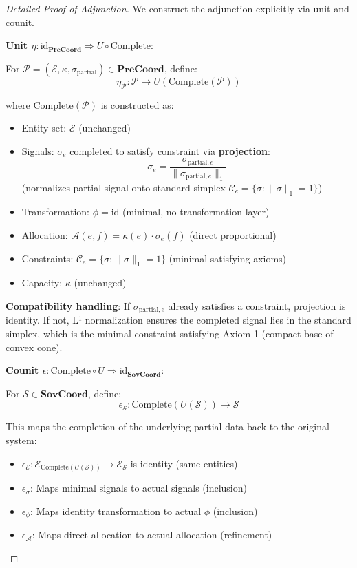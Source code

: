 \documentclass[11pt,a4paper]{article}
\theoremstyle{definition}
\theoremstyle{remark}
\newcommand{\E}{\mathcal{E}}
\newcommand{\A}{\mathcal{A}}
\newcommand{\C}{\mathcal{C}}
\newcommand{\SovCoord}{\mathbf{SovCoord}}
\begin{document}
\begin{proof}[Detailed Proof of Adjunction]
We construct the adjunction explicitly via unit and counit.

\textbf{Unit $\eta: \text{id}_{\mathbf{PreCoord}} \Rightarrow U \circ \text{Complete}$}:

For $\mathcal{P} = (\E, \kappa, \sigma_{\text{partial}}) \in \mathbf{PreCoord}$, define:
\[ \eta_{\mathcal{P}}: \mathcal{P} \to U(\text{Complete}(\mathcal{P})) \]

where $\text{Complete}(\mathcal{P})$ is constructed as:
\begin{itemize}
\item Entity set: $\E$ (unchanged)
\item Signals: $\sigma_e$ completed to satisfy constraint via \textbf{projection}:
  \[ \sigma_e = \frac{\sigma_{\text{partial},e}}{\|\sigma_{\text{partial},e}\|_1} \]
  (normalizes partial signal onto standard simplex $\C_e = \{\sigma : \|\sigma\|_1 = 1\}$)
\item Transformation: $\phi = \text{id}$ (minimal, no transformation layer)
\item Allocation: $\A(e,f) = \kappa(e) \cdot \sigma_e(f)$ (direct proportional)
\item Constraints: $\C_e = \{\sigma : \|\sigma\|_1 = 1\}$ (minimal satisfying axioms)
\item Capacity: $\kappa$ (unchanged)
\end{itemize}

\textbf{Compatibility handling}: If $\sigma_{\text{partial},e}$ already satisfies a constraint, projection is identity. If not, L¹ normalization ensures the completed signal lies in the standard simplex, which is the minimal constraint satisfying Axiom 1 (compact base of convex cone).

\textbf{Counit $\epsilon: \text{Complete} \circ U \Rightarrow \text{id}_{\SovCoord}$}:

For $\mathcal{S} \in \SovCoord$, define:
\[ \epsilon_{\mathcal{S}}: \text{Complete}(U(\mathcal{S})) \to \mathcal{S} \]

This maps the completion of the underlying partial data back to the original system:
\begin{itemize}
\item $\epsilon_{\E}: \E_{\text{Complete}(U(\mathcal{S}))} \to \E_{\mathcal{S}}$ is identity (same entities)
\item $\epsilon_{\sigma}$: Maps minimal signals to actual signals (inclusion)
\item $\epsilon_{\phi}$: Maps identity transformation to actual $\phi$ (inclusion)
\item $\epsilon_{\A}$: Maps direct allocation to actual allocation (refinement)
\end{itemize}


\end{proof}
\end{document}
